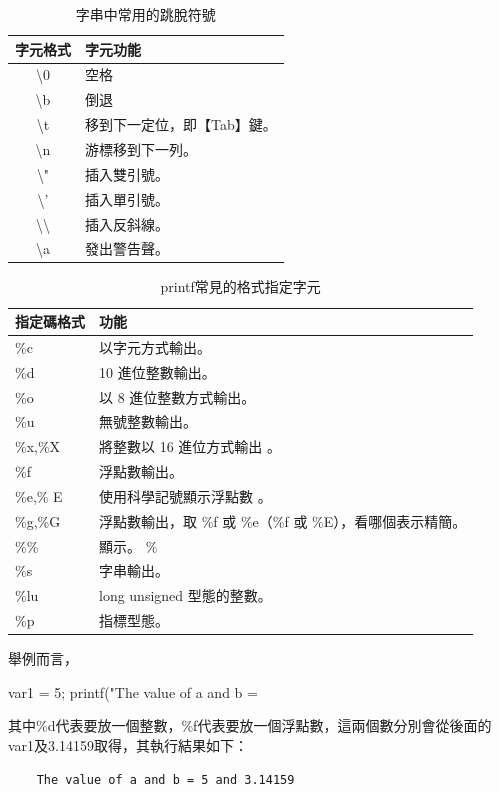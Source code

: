 \begin{table}[H]
\centering
\caption{字串中常用的跳脫符號}
\begin{tabular}{|c|l|}
	\hline
	\rowcolor{LightCyan}
	字元格式 & 字元功能\\
	\hline
	\textbackslash 0& 空格\\
	\hline
	\textbackslash b& 倒退\\
	\hline
	\textbackslash t&移到下一定位，即【Tab】鍵。\\
	\hline
	\textbackslash n&游標移到下一列。\\
	\hline
	\textbackslash "&插入雙引號。\\
	\hline
	\textbackslash '&插入單引號。\\
	\hline
	\textbackslash \textbackslash&插入反斜線。\\
	\hline
	\textbackslash a &發出警告聲。\\
	\hline
\end{tabular}
\label{escapechar}
\end{table}

\begin{table}[H]
\centering
\caption{printf常見的格式指定字元}
\begin{tabular}{|l|l|}
	\hline
	\rowcolor{LightCyan}
	指定碼格式 & 功能\\
	\hline
	\%c& 以字元方式輸出。 \\
	\hline
	\%d&  	10 進位整數輸出。\\
	\hline
	\%o& 	以 8 進位整數方式輸出。\\
	\hline
	\%u&  	無號整數輸出。\\
	\hline
	\%x,\%X &	將整數以 16 進位方式輸出 。\\
	\hline
	\%f&  浮點數輸出。\\
	\hline
	\%e,\% E& 	使用科學記號顯示浮點數 。\\
	\hline
	\%g,\%G &浮點數輸出，取 \%f 或 \%e（\%f 或 \%E），看哪個表示精簡。\\
	\hline
	\%\% &顯示。 \%\\
	\hline
	\%s & 	字串輸出。 \\
	\hline
	\%lu &long unsigned 型態的整數。\\
	\hline
	\%p &指標型態。\\
	\hline
\end{tabular}
\label{specifier}
\end{table}

舉例而言，
\begin{inside}
	var1 = 5;
	printf("The value of a and b = %
\end{inside}
其中\%d代表要放一個整數，\%f代表要放一個浮點數，這兩個數分別會從後面的var1及3.14159取得，其執行結果如下：
\begin{Verbatim}
	The value of a and b = 5 and 3.14159
\end{Verbatim}

